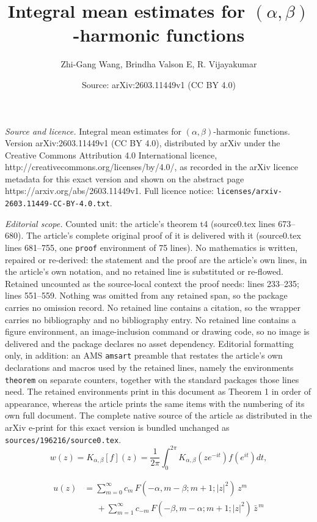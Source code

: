 \documentclass[10pt,a4paper]{amsart}
\title{Integral mean estimates for $(\alpha,\beta)$-harmonic functions}
\author{Zhi-Gang Wang, Brindha Valson E, R. Vijayakumar}
\date{Source: arXiv:2603.11449v1 (CC BY 4.0)}
\begin{document}
\maketitle

\noindent\emph{Source and licence.} Integral mean estimates for $(\alpha,\beta)$-harmonic functions. Version arXiv:2603.11449v1 (CC BY 4.0), distributed by arXiv under the Creative Commons Attribution 4.0 International licence, http://creativecommons.org/licenses/by/4.0/, as recorded in the arXiv licence metadata for this exact version and shown on the abstract page https://arxiv.org/abs/2603.11449v1. Full licence notice: \texttt{licenses/arxiv-2603.11449-CC-BY-4.0.txt}.\par\smallskip

\noindent\textit{Editorial scope.} Counted unit: the article's theorem t4 (source0.tex lines 673--680). The article's complete original proof of it is delivered with it (source0.tex lines 681--755, one \texttt{proof} environment of 75 lines). No mathematics is written, repaired or re-derived: the statement and the proof are the article's own lines, in the article's own notation, and no retained line is substituted or re-flowed.  Retained uncounted as the source-local context the proof needs: lines 233--235; lines 551--559.  Nothing was omitted from any retained span, so the package carries no omission record.  No retained line contains a citation, so the wrapper carries no bibliography and no bibliography entry.  No retained line contains a figure environment, an image-inclusion command or drawing code, so no image is delivered and the package declares no asset dependency.  Editorial formatting only, in addition: an AMS \texttt{amsart} preamble that restates the article's own declarations and macros used by the retained lines, namely the environments \texttt{theorem} on separate counters, together with the standard packages those lines need.  The retained environments print in this document as Theorem 1 in order of appearance, whereas the article prints the same items with the numbering of its own full document.  The complete native source of the article as distributed in the arXiv e-print for this exact version is bundled unchanged as \texttt{sources/196216/source0.tex}.
		\begin{equation}\label{poisson_integral}
			w(z) = K_{\alpha,\beta}[f](z) = \frac{1}{2\pi} \int_0^{2\pi} K_{\alpha,\beta}\left(z e^{-it}\right) f\left(e^{it}\right)dt,
		\end{equation}

		\begin{equation}\label{series of (alpha,beta)}
			\begin{aligned}
				u(z)
				&= \sum_{m=0}^{\infty}
				c_m\,F(-\alpha,m-\beta; m+1; |z|^2)\,z^m  \\
				&\quad\ \ +\sum_{m=1}^{\infty}
				c_{-m}\,F(-\beta,m-\alpha; m+1; |z|^2)\,\bar z^{\,m}
			\end{aligned}
			\end{equation}
\end{document}
